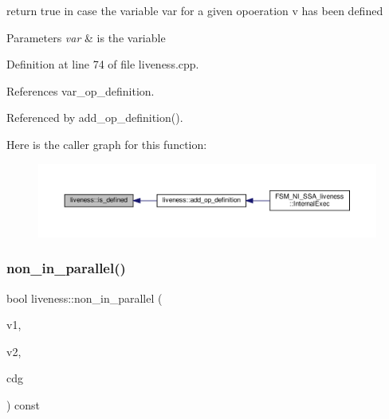 return true in case the variable var for a given opoeration v has been defined 


\begin{DoxyParams}{Parameters}
{\em var} & is the variable \\
\hline
\end{DoxyParams}


Definition at line 74 of file liveness.\+cpp.



References var\+\_\+op\+\_\+definition.



Referenced by add\+\_\+op\+\_\+definition().

Here is the caller graph for this function\+:
\nopagebreak
\begin{figure}[H]
\begin{center}
\leavevmode
\includegraphics[width=350pt]{d3/d1f/classliveness_a184761795960c7d447a2a20799bbe020_icgraph}
\end{center}
\end{figure}
\mbox{\label{classliveness_a0ff38bbfa3d6bc5a3228fe2c1bd408f7}} 
\subsubsection{\texorpdfstring{non\+\_\+in\+\_\+parallel()}{non\_in\_parallel()}}
{\footnotesize\ttfamily bool liveness\+::non\+\_\+in\+\_\+parallel (\begin{DoxyParamCaption}\item[{\hyperlink{graph_8hpp_abefdcf0544e601805af44eca032cca14}{vertex}}]{v1,  }\item[{\hyperlink{graph_8hpp_abefdcf0544e601805af44eca032cca14}{vertex}}]{v2,  }\item[{const \hyperlink{basic__block_8hpp_ab66bdbde3a29e41d079d8a320af9c921}{B\+B\+Graph\+Const\+Ref}}]{cdg }\end{DoxyParamCaption}) const}




